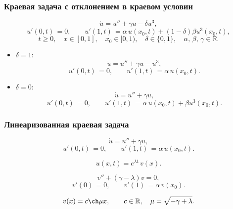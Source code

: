 \documentclass[fullscreen=true, unicode, bookmarks=false]{beamer}
\begin{document}
\begin{frame}
\frametitle{ Краевая задача с отклонением в краевом условии }

$$
\dot u = u'' + \gamma u - \delta u^3,	
$$
$$
u'(0, t) \, = 0, \qquad u'(1, t) \, = \alpha\,u(x_0, t) + (1 - \delta) \beta u^3(x_0, t),
$$
$$ t \geqslant 0, \quad x \in [0,1], \quad x_0 \in [0, 1), \quad  \delta \in \{0, 1\}, \quad \alpha,\,\beta,\,\gamma \in \mathbb{R}. $$

\vfill

\begin{itemize}

\item $ \delta = 1: $
\begin{equation}\label{problem_cube_in_eq}
	\dot u = u'' + \gamma u - u^3,	
\end{equation}
\begin{equation}\label{conditions_cube_in_eq}
	u'(0, t) \, = 0, \qquad u'(1, t) \, = \alpha\,u(x_0, t).
\end{equation}

\item $ \delta = 0: $
\begin{equation}\label{problem_cube_in_cond}
	\dot u = u'' + \gamma u,	
\end{equation}
\begin{equation}\label{conditions_cube_in_cond}
	u'(0, t) \, = 0, \qquad u'(1, t) \, = \alpha\,u(x_0, t) + \beta u^3(x_0, t).
\end{equation}

\end{itemize}

\end{frame}

\begin{frame}
\frametitle{ Линеаризованная краевая задача }

\begin{equation}\label{linear_problem}
	\dot u = u'' + \gamma u,	
\end{equation}
\begin{equation}\label{linear_conditions}
	u'(0, t) \, = 0, \qquad u'(1, t) \, = \alpha\,u(x_0, t).
\end{equation}

\vfill

$$ u(x, t) = e^{\lambda t} \, v(x). $$

\vfill
 
$$
v'' + (\gamma - \lambda)v = 0,
$$
$$
v'(0) \, = 0, \qquad v'(1) \, = \alpha\,v(x_0).
$$

\vfill

$$ v(x) = c \ch  \mu x, \qquad c \in \mathbb{R}, \quad \mu = \sqrt{-\gamma + \lambda}. $$

\end{frame}
\end{document}
